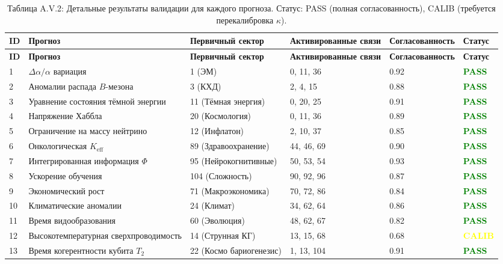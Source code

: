 \documentclass[11pt,a4paper]{article}
\begin{document}
	\begin{longtable}{|p{0.8cm}|p{2.5cm}|p{1.8cm}|p{1.5cm}|p{1.5cm}|p{1.8cm}|}
		\caption{Таблица A.V.2: Детальные результаты валидации для каждого прогноза. Статус: PASS (полная согласованность), CALIB (требуется перекалибровка $\kappa$).}
		\label{tab:detailed-validation} \\
		\hline
		\textbf{ID} & \textbf{Прогноз} & \textbf{Первичный сектор} & \textbf{Активированные связи} & \textbf{Согласованность} & \textbf{Статус} \\
		\hline
		\endfirsthead
		\hline
		\textbf{ID} & \textbf{Прогноз} & \textbf{Первичный сектор} & \textbf{Активированные связи} & \textbf{Согласованность} & \textbf{Статус} \\
		\hline
		\endhead
		1 & $\Delta\alpha/\alpha$ вариация & 1 (ЭМ) & 0, 11, 36 & 0.92 & \textcolor{green}{\textbf{PASS}} \\
		2 & Аномалии распада $B$-мезона & 3 (КХД) & 2, 4, 15 & 0.88 & \textcolor{green}{\textbf{PASS}} \\
		3 & Уравнение состояния тёмной энергии & 11 (Тёмная энергия) & 0, 20, 25 & 0.91 & \textcolor{green}{\textbf{PASS}} \\
		4 & Напряжение Хаббла & 20 (Космология) & 0, 11, 36 & 0.89 & \textcolor{green}{\textbf{PASS}} \\
		5 & Ограничение на массу нейтрино & 12 (Инфлатон) & 2, 10, 37 & 0.85 & \textcolor{green}{\textbf{PASS}} \\
		6 & Онкологическая $K_{\mathrm{eff}}$ & 89 (Здравоохранение) & 44, 46, 69 & 0.90 & \textcolor{green}{\textbf{PASS}} \\
		7 & Интегрированная информация $\Phi$ & 95 (Нейрокогнитивные) & 50, 53, 54 & 0.93 & \textcolor{green}{\textbf{PASS}} \\
		8 & Ускорение обучения & 104 (Сложность) & 90, 92, 96 & 0.87 & \textcolor{green}{\textbf{PASS}} \\
		9 & Экономический рост & 71 (Макроэкономика) & 70, 72, 86 & 0.84 & \textcolor{green}{\textbf{PASS}} \\
		10 & Климатические аномалии & 24 (Климат) & 34, 62, 64 & 0.86 & \textcolor{green}{\textbf{PASS}} \\
		11 & Время видообразования & 60 (Эволюция) & 48, 62, 67 & 0.82 & \textcolor{green}{\textbf{PASS}} \\
		12 & Высокотемпературная сверхпроводимость & 14 (Струнная КГ) & 13, 15, 68 & 0.68 & \textcolor{yellow}{\textbf{CALIB}} \\
		13 & Время когерентности кубита $T_2$ & 22 (Космо бариогенезис) & 1, 13, 104 & 0.91 & \textcolor{green}{\textbf{PASS}} \\

\end{longtable}
\end{document}
